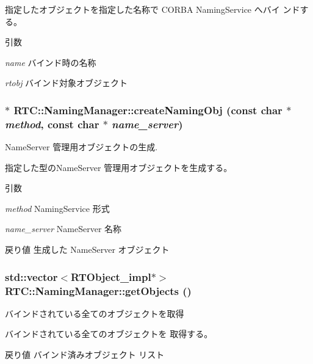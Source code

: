指定したオブジェクトを指定した名称で CORBA NamingService へバイ ンドする。


\begin{DoxyParams}{引数}
\item[{\em name}]バインド時の名称 \item[{\em rtobj}]バインド対象オブジェクト \end{DoxyParams}
\subsubsection[{createNamingObj}]{$\ast$ RTC::NamingManager::createNamingObj (const char $\ast$ {\em method}, \/  const char $\ast$ {\em name\_\-server})\hspace{0.3cm}{\ttfamily  [protected]}}\label{classRTC_1_1NamingManager_a3c337a0f68c16203eb911d009b190a5a}


NameServer 管理用オブジェクトの生成. 

指定した型のNameServer 管理用オブジェクトを生成する。


\begin{DoxyParams}{引数}
\item[{\em method}]NamingService 形式 \item[{\em name\_\-server}]NameServer 名称\end{DoxyParams}
\begin{DoxyReturn}{戻り値}
生成した NameServer オブジェクト 
\end{DoxyReturn}
\subsubsection[{getObjects}]{\setlength{\rightskip}{0pt plus 5cm}std::vector$<${\bf RTObject\_\-impl}$\ast$$>$ RTC::NamingManager::getObjects ()}\label{classRTC_1_1NamingManager_a01f71c35884ad26284094de49b504dd0}


バインドされている全てのオブジェクトを取得 

バインドされている全てのオブジェクトを 取得する。

\begin{DoxyReturn}{戻り値}
バインド済みオブジェクト リスト 
\end{DoxyReturn}
